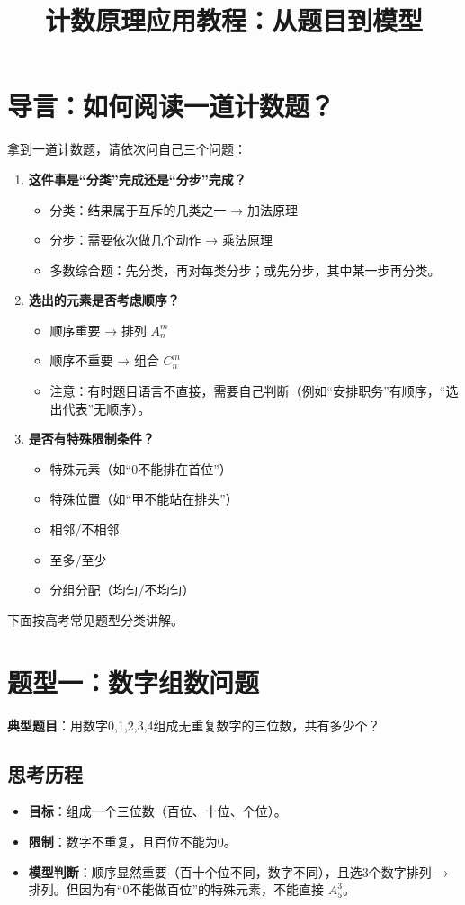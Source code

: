 \documentclass[10pt]{article}
\title{计数原理应用教程：从题目到模型}
\author{}
\date{}
\begin{document}
\maketitle

\section{导言：如何阅读一道计数题？}

拿到一道计数题，请依次问自己三个问题：

\begin{enumerate}
\item \textbf{这件事是“分类”完成还是“分步”完成？}
\begin{itemize}
\item 分类：结果属于互斥的几类之一 → 加法原理
\item 分步：需要依次做几个动作 → 乘法原理
\item 多数综合题：先分类，再对每类分步；或先分步，其中某一步再分类。
\end{itemize}
\item \textbf{选出的元素是否考虑顺序？}
\begin{itemize}
\item 顺序重要 → 排列 \(A_n^m\)
\item 顺序不重要 → 组合 \(C_n^m\)
\item 注意：有时题目语言不直接，需要自己判断（例如“安排职务”有顺序，“选出代表”无顺序）。
\end{itemize}
\item \textbf{是否有特殊限制条件？}
\begin{itemize}
\item 特殊元素（如“0不能排在首位”）
\item 特殊位置（如“甲不能站在排头”）
\item 相邻/不相邻
\item 至多/至少
\item 分组分配（均匀/不均匀）
\end{itemize}
\end{enumerate}

下面按高考常见题型分类讲解。

\section{题型一：数字组数问题}

\textbf{典型题目}：用数字0,1,2,3,4组成无重复数字的三位数，共有多少个？

\subsection*{思考历程}
\begin{itemize}
\item \textbf{目标}：组成一个三位数（百位、十位、个位）。
\item \textbf{限制}：数字不重复，且百位不能为0。
\item \textbf{模型判断}：顺序显然重要（百十个位不同，数字不同），且选3个数字排列 → 排列。但因为有“0不能做百位”的特殊元素，不能直接 \(A_5^3\)。
\end{itemize}
\end{document}
